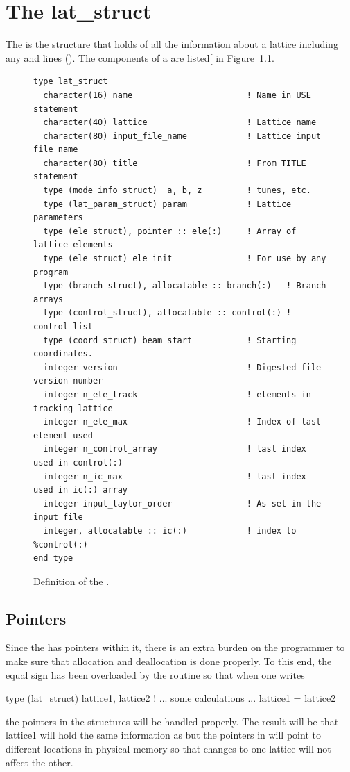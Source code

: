 \chapter{The lat_struct}
\label{c:lat.struct}

The  is the structure that holds of all the information
about a lattice including any  and  lines
(). The components of a  are listed[ in
Figure~\ref{f:lat.struct}.
\begin{figure}[htb]
\centering
\begin{verbatim}
type lat_struct
  character(16) name                       ! Name in USE statement
  character(40) lattice                    ! Lattice name
  character(80) input_file_name            ! Lattice input file name
  character(80) title                      ! From TITLE statement
  type (mode_info_struct)  a, b, z         ! tunes, etc.
  type (lat_param_struct) param            ! Lattice parameters
  type (ele_struct), pointer :: ele(:)     ! Array of lattice elements
  type (ele_struct) ele_init               ! For use by any program
  type (branch_struct), allocatable :: branch(:)   ! Branch arrays
  type (control_struct), allocatable :: control(:) ! control list
  type (coord_struct) beam_start           ! Starting coordinates.
  integer version                          ! Digested file version number
  integer n_ele_track                      ! elements in tracking lattice
  integer n_ele_max                        ! Index of last element used
  integer n_control_array                  ! last index used in control(:)
  integer n_ic_max                         ! last index used in ic(:) array
  integer input_taylor_order               ! As set in the input file
  integer, allocatable :: ic(:)            ! index to %control(:)
end type
\end{verbatim}
\caption{Definition of the .}
\label{f:lat.struct}
\end{figure}

\section{Pointers}
\label{s:lat:point}

Since the  has pointers within it, there is an extra
burden on the programmer to make sure that allocation and deallocation
is done properly. To this end, the equal sign has been overloaded by
the routine  so that when one writes
\begin{example}
    type (lat_struct) lattice1, lattice2
    ! ... some calculations ...
    lattice1 = lattice2
\end{example}
the pointers in the  structures will be handled
properly. The result will be that lattice1 will hold the same
information as  but the pointers in  will
point to different locations in physical memory so that changes to one
lattice will not affect the other.

